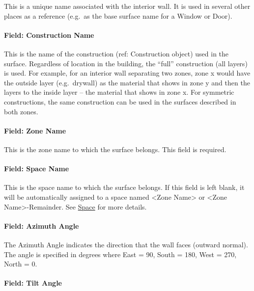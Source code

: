 This is a unique name associated with the interior wall. It is used in several other places as a reference (e.g.~as the base surface name for a Window or Door).

\paragraph{Field: Construction Name}\label{field-construction-name-1-001}

This is the name of the construction (ref: Construction object) used in the surface. Regardless of location in the building, the ``full'' construction (all layers) is used. For example, for an interior wall separating two zones, zone x would have the outside layer (e.g.~drywall) as the material that shows in zone y and then the layers to the inside layer -- the material that shows in zone x. For symmetric constructions, the same construction can be used in the surfaces described in both zones.

\paragraph{Field: Zone Name}\label{field-zone-name-1-009}

This is the zone name to which the surface belongs. This field is required.

\paragraph{Field: Space Name}\label{field-space-name-1-009}

This is the space name to which the surface belongs. If this field is left blank, it will be automatically assigned to a space named <Zone Name> or <Zone Name>-Remainder. See \hyperref[space]{Space} for more details.

\paragraph{Field: Azimuth Angle}\label{field-azimuth-angle-1}

The Azimuth Angle indicates the direction that the wall faces (outward normal). The angle is specified in degrees where East = 90, South = 180, West = 270, North = 0.

\paragraph{Field: Tilt Angle}\label{field-tilt-angle-1}

